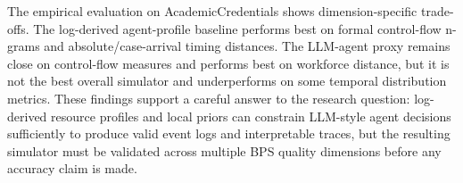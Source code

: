 The empirical evaluation on AcademicCredentials shows dimension-specific
trade-offs. The log-derived agent-profile baseline performs best on
formal control-flow n-grams and absolute/case-arrival timing distances.
The LLM-agent proxy remains close on control-flow measures and performs
best on workforce distance, but it is not the best overall simulator and
underperforms on some temporal distribution metrics. These findings
support a careful answer to the research question: log-derived resource
profiles and local priors can constrain LLM-style agent decisions
sufficiently to produce valid event logs and interpretable traces, but
the resulting simulator must be validated across multiple BPS quality
dimensions before any accuracy claim is made.
